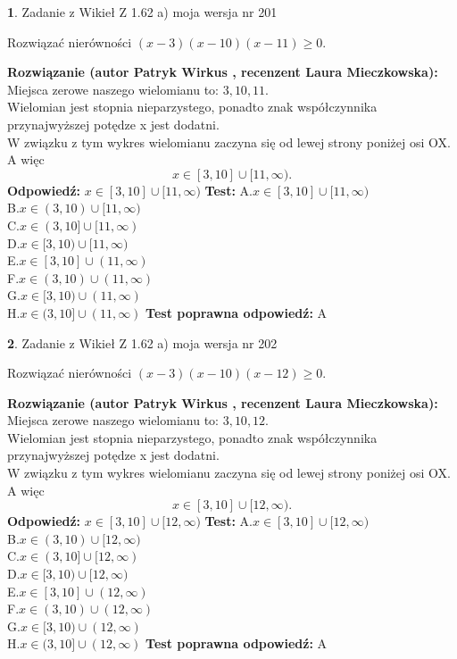 \documentclass[12pt, a4paper]{article}
\theoremstyle{definition} %
\newtheorem{zad}{}
\newcommand{\zadStart}[1]{\begin{zad}#1\newline}
\newcommand{\zadStop}{\end{zad}}
\newcommand{\rozwStart}[2]{\noindent \textbf{Rozwiązanie (autor #1 , recenzent #2): }\newline}
\newcommand{\rozwStop}{\newline}
\newcommand{\odpStart}{\noindent \textbf{Odpowiedź:}\newline}
\newcommand{\odpStop}{\newline}
\newcommand{\testStart}{\noindent \textbf{Test:}\newline}
\newcommand{\testStop}{\newline}
\newcommand{\kluczStart}{\noindent \textbf{Test poprawna odpowiedź:}\newline}
\newcommand{\kluczStop}{\newline}
\begin{document}
\zadStart{Zadanie z Wikieł Z 1.62 a) moja wersja nr 201}

Rozwiązać nierówności $(x-3)(x-10)(x-11)\ge0$.
\zadStop
\rozwStart{Patryk Wirkus}{Laura Mieczkowska}
Miejsca zerowe naszego wielomianu to: $3, 10, 11$.\\
Wielomian jest stopnia nieparzystego, ponadto znak współczynnika przy\linebreak najwyższej potędze x jest dodatni.\\ W związku z tym wykres wielomianu zaczyna się od lewej strony poniżej osi OX. A więc $$x \in [3,10] \cup [11,\infty).$$
\rozwStop
\odpStart
$x \in [3,10] \cup [11,\infty)$
\odpStop
\testStart
A.$x \in [3,10] \cup [11,\infty)$\\
B.$x \in (3,10) \cup [11,\infty)$\\
C.$x \in (3,10] \cup [11,\infty)$\\
D.$x \in [3,10) \cup [11,\infty)$\\
E.$x \in [3,10] \cup (11,\infty)$\\
F.$x \in (3,10) \cup (11,\infty)$\\
G.$x \in [3,10) \cup (11,\infty)$\\
H.$x \in (3,10] \cup (11,\infty)$
\testStop
\kluczStart
A
\kluczStop



\zadStart{Zadanie z Wikieł Z 1.62 a) moja wersja nr 202}

Rozwiązać nierówności $(x-3)(x-10)(x-12)\ge0$.
\zadStop
\rozwStart{Patryk Wirkus}{Laura Mieczkowska}
Miejsca zerowe naszego wielomianu to: $3, 10, 12$.\\
Wielomian jest stopnia nieparzystego, ponadto znak współczynnika przy\linebreak najwyższej potędze x jest dodatni.\\ W związku z tym wykres wielomianu zaczyna się od lewej strony poniżej osi OX. A więc $$x \in [3,10] \cup [12,\infty).$$
\rozwStop
\odpStart
$x \in [3,10] \cup [12,\infty)$
\odpStop
\testStart
A.$x \in [3,10] \cup [12,\infty)$\\
B.$x \in (3,10) \cup [12,\infty)$\\
C.$x \in (3,10] \cup [12,\infty)$\\
D.$x \in [3,10) \cup [12,\infty)$\\
E.$x \in [3,10] \cup (12,\infty)$\\
F.$x \in (3,10) \cup (12,\infty)$\\
G.$x \in [3,10) \cup (12,\infty)$\\
H.$x \in (3,10] \cup (12,\infty)$
\testStop
\kluczStart
A
\kluczStop
\end{document}
